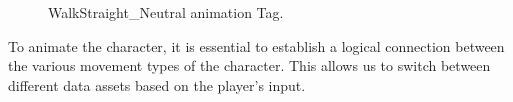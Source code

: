 \documentclass[12pt]{book}
\begin{document}
 \begin{figure}[!h]
    \centering
    \caption{WalkStraight\_Neutral animation Tag.}
   \end{figure}
To animate the character, it is essential to establish a logical connection between the various movement types of the character. This allows us to switch between different data assets based on the player's input.  
\end{document}
